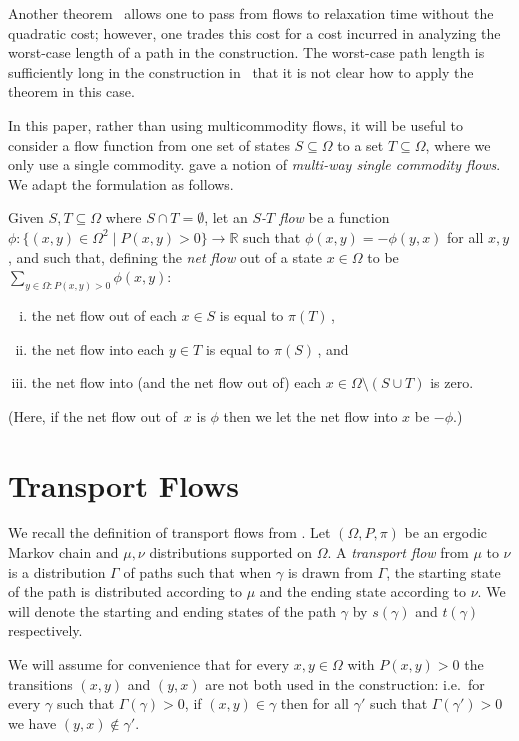 \documentclass[a4paper, 12p]{article}
\numberwithin{equation}{section}
\begin{document}
Another theorem~\cite{diacstroock} allows one to pass from flows to relaxation time without the quadratic cost; however, one trades this cost for a cost incurred in analyzing the worst-case length of a path in the construction. The worst-case path length is sufficiently long in the construction in~\cite{eppstein2022improved} that it is not clear how to apply the theorem in this case.

In this paper, rather than using multicommodity flows, it will be useful to consider a flow function from one set of states $S \subseteq \Omega$ to a set $T \subseteq \Omega$, where we only use a single commodity. \cite{eppstein2022improved} gave a notion of \emph{multi-way single commodity flows}. We adapt the formulation as follows.

Given $S, T \subseteq \Omega$ where $S \cap T = \emptyset$, let an \emph{$S$-$T$ flow} be a function $\phi: \{(x, y) \in \Omega^2 \mid P(x, y) > 0\} \rightarrow \mathbb{R}$ such that $\phi(x, y) = -\phi(y, x)$ for all $x, y$, and such that,  defining the \emph{net flow} out of a state $x \in \Omega$ to be $\sum_{y \in \Omega: P(x, y) > 0} \phi(x, y)$:
\begin{enumerate}[(i)]
\item the net flow out of each $x \in S$ is equal to $\pi(T)$\,,
\item the net flow into each $y \in T$ is equal to $\pi(S)$\,, and 
\item the net flow into (and the net flow out of) each $x \in \Omega \setminus \left(S \cup T\right)$ is zero.
\end{enumerate}
(Here, if the net flow out of~$x$ is $\phi$ then we let the net flow into $x$ be $-\phi$.) 

\section{Transport Flows}\label{sec:transport_flow}
We recall the definition of transport flows from \cite{weimingjs}. Let $(\Omega, P, \pi)$ be an ergodic Markov chain and   $\mu, \nu$  distributions supported on $\Omega$. A \emph{transport flow} from $\mu$ to $\nu$ is a distribution $\Gamma$ of paths such that when $\gamma$ is drawn from $\Gamma$, the starting state of the path is distributed according to $\mu$ and the ending state according to $\nu$. We will denote the starting and ending states of the path $\gamma$ by $s(\gamma)$ and $t(\gamma)$ respectively.

We will assume for convenience that for every $x, y \in \Omega$ with $P(x, y) > 0$ the transitions $(x,y)$ and $(y, x)$ are not both used in the construction: i.e.~for every $\gamma$ such that $\Gamma(\gamma) > 0$, if $(x, y) \in \gamma$ then for all $\gamma'$ such that $\Gamma(\gamma') > 0$ we have $(y, x) \notin \gamma'$. 
\end{document}
